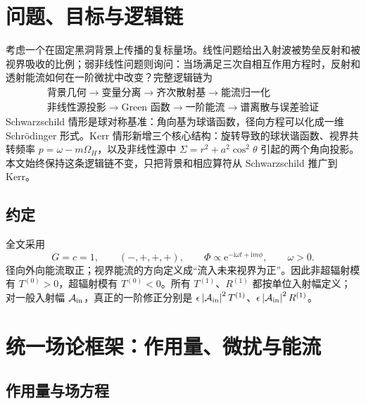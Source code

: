 \documentclass[UTF8,fontset=fandol,11pt,a4paper,oneside]{ctexart}
\numberwithin{equation}{section}
\newcommand{\ii}{\mathrm i}
\newcommand{\ee}{\mathrm e}
\newcommand{\abs}[1]{\left|#1\right|}
\begin{document}
\section{问题、目标与逻辑链}

考虑一个在固定黑洞背景上传播的复标量场。线性问题给出入射波被势垒反射和被视界吸收的比例；弱非线性问题则询问：当场满足三次自相互作用方程时，反射和透射能流如何在一阶微扰中改变？完整逻辑链为
\begin{equation}
\boxed{\begin{gathered}
\text{背景几何}\to\text{变量分离}\to\text{齐次散射基}
\to\text{能流归一化}\\
\text{非线性源投影}\to\text{Green 函数}\to\text{一阶能流}
\to\text{谱离散与误差验证}
\end{gathered}}
\end{equation}
Schwarzschild 情形是球对称基准：角向基为球谐函数，径向方程可以化成一维 Schr\"odinger 形式。Kerr 情形新增三个核心结构：旋转导致的球状谐函数、视界共转频率 $p=\omega-m\Omega_H$，以及非线性源中 $\Sigma=r^2+a^2\cos^2\theta$ 引起的两个角向投影。本文始终保持这条逻辑链不变，只把背景和相应算符从 Schwarzschild 推广到 Kerr。

\subsection{约定}

全文采用
\begin{equation}
G=c=1,\qquad (-,+,+,+),\qquad
\Phi\propto \ee^{-\ii\omega t+\ii m\phi},\qquad \omega>0.
\end{equation}
径向外向能流取正；视界能流的方向定义成“流入未来视界为正”。因此非超辐射模有 $T^{(0)}>0$，超辐射模有 $T^{(0)}<0$。所有 $T^{(1)}$、$R^{(1)}$ 都按单位入射幅定义；对一般入射幅 $\mathcal A_{\rm in}$，真正的一阶修正分别是 $\epsilon\abs{\mathcal A_{\rm in}}^2T^{(1)}$、$\epsilon\abs{\mathcal A_{\rm in}}^2R^{(1)}$。

\section{统一场论框架：作用量、微扰与能流}
\label{sec:field-theory}

\subsection{作用量与场方程}
\end{document}
